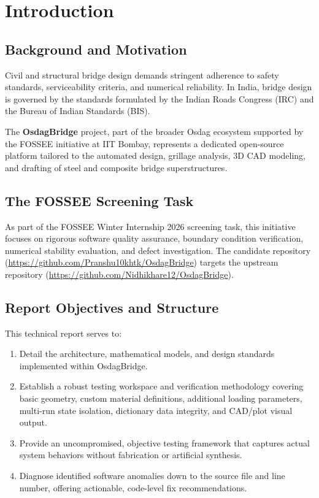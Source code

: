 \chapter{Introduction}
\label{chap:introduction}

\section{Background and Motivation}
Civil and structural bridge design demands stringent adherence to safety standards, serviceability criteria, and numerical reliability. In India, bridge design is governed by the standards formulated by the Indian Roads Congress (IRC) and the Bureau of Indian Standards (BIS). 

The \textbf{OsdagBridge} project, part of the broader Osdag ecosystem supported by the FOSSEE initiative at IIT Bombay, represents a dedicated open-source platform tailored to the automated design, grillage analysis, 3D CAD modeling, and drafting of steel and composite bridge superstructures.

\section{The FOSSEE Screening Task}
As part of the FOSSEE Winter Internship 2026 screening task, this initiative focuses on rigorous software quality assurance, boundary condition verification, numerical stability evaluation, and defect investigation. The candidate repository (\url{https://github.com/Pranshu10khtk/OsdagBridge}) targets the upstream repository (\url{https://github.com/Nidhikhare12/OsdagBridge}).

\section{Report Objectives and Structure}
This technical report serves to:
\begin{enumerate}
    \item Detail the architecture, mathematical models, and design standards implemented within OsdagBridge.
    \item Establish a robust testing workspace and verification methodology covering basic geometry, custom material definitions, additional loading parameters, multi-run state isolation, dictionary data integrity, and CAD/plot visual output.
    \item Provide an uncompromised, objective testing framework that captures actual system behaviors without fabrication or artificial synthesis.
    \item Diagnose identified software anomalies down to the source file and line number, offering actionable, code-level fix recommendations.
\end{enumerate}
